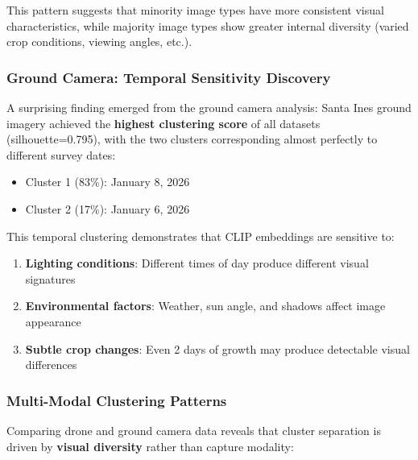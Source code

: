 This pattern suggests that minority image types have more consistent visual characteristics, while majority image types show greater internal diversity (varied crop conditions, viewing angles, etc.).


\subsubsection{Ground Camera: Temporal Sensitivity Discovery}

A surprising finding emerged from the ground camera analysis: Santa Ines ground imagery achieved the \textbf{highest clustering score} of all datasets (silhouette=0.795), with the two clusters corresponding almost perfectly to different survey dates:

\begin{itemize}
    \item Cluster 1 (83\%): January 8, 2026
    \item Cluster 2 (17\%): January 6, 2026
\end{itemize}

This temporal clustering demonstrates that CLIP embeddings are sensitive to:
\begin{enumerate}
    \item \textbf{Lighting conditions}: Different times of day produce different visual signatures
    \item \textbf{Environmental factors}: Weather, sun angle, and shadows affect image appearance
    \item \textbf{Subtle crop changes}: Even 2 days of growth may produce detectable visual differences
\end{enumerate}


\subsubsection{Multi-Modal Clustering Patterns}

Comparing drone and ground camera data reveals that cluster separation is driven by \textbf{visual diversity} rather than capture modality:

